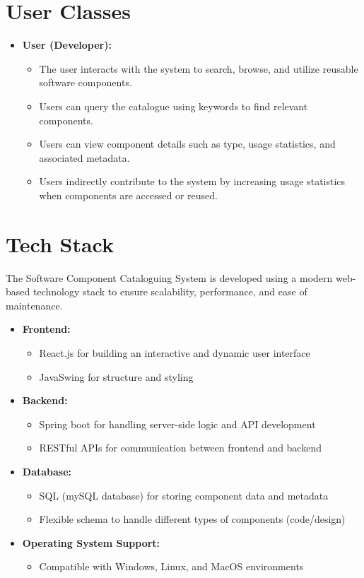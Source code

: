 \documentclass[12pt]{scrreprt}
\begin{document}
\section{User Classes}
\begin{itemize}
    \item \textbf{User (Developer):}
    \begin{itemize}
        \item The user interacts with the system to search, browse, and utilize reusable software components.
        \item Users can query the catalogue using keywords to find relevant components.
        \item Users can view component details such as type, usage statistics, and associated metadata.
        \item Users indirectly contribute to the system by increasing usage statistics when components are accessed or reused.
    \end{itemize}
\end{itemize}

\section{Tech Stack}

The Software Component Cataloguing System is developed using a modern web-based technology stack to ensure scalability, performance, and ease of maintenance.

\begin{itemize}
    \item \textbf{Frontend:}
    \begin{itemize}
        \item React.js for building an interactive and dynamic user interface
        \item JavaSwing for structure and styling
    \end{itemize}
    
    \item \textbf{Backend:}
    \begin{itemize}
        \item Spring boot for handling server-side logic and API development
        \item RESTful APIs for communication between frontend and backend
    \end{itemize}
    
    \item \textbf{Database:}
    \begin{itemize}
        \item SQL (mySQL database) for storing component data and metadata
        \item Flexible schema to handle different types of components (code/design)
    \end{itemize}
    
    \item \textbf{Operating System Support:}
    \begin{itemize}
        \item Compatible with Windows, Linux, and MacOS environments
    \end{itemize}
\end{itemize}
\end{document}
